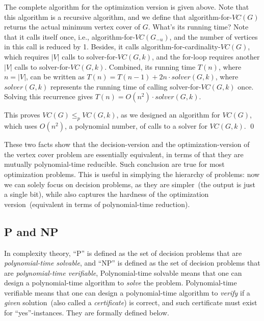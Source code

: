 \begin{algorithmblock}[0.8\textwidth]
	\xxx
	\xxx
	\xxx
	\xxx
	\xxx
	\xxx
	\xxx
	\xxx
\end{algorithmblock}

The complete algorithm for the optimization version is given above.
Note that this algorithm is a recursive algorithm, and we define
that algorithm-for-$VC(G)$ returns the actual minimum vertex cover of $G$.
What's its running time? Note that it calls itself once, i.e., 
algorithm-for-$VC(G_{-u})$, and the number of vertices in this call
is reduced by 1. Besides, it calls algorithm-for-cardinality-$VC(G)$,
which requires $|V|$ calls to solver-for-$VC(G, k)$,
and the for-loop requires another $|V|$ calls to solver-for-$VC(G, k)$.
Combined, its running time $T(n)$, where $n = |V|$, can be written
as $T(n) = T(n-1) + 2n\cdot solver(G,k)$, where $solver(G,k)$ represents
the running time of calling solver-for-$VC(G, k)$ once.
Solving this recurrence gives $T(n) = O(n^2)\cdot solver(G,k)$.

This proves $VC(G) \le_p VC(G,k)$, as we designed an algorithm
for $VC(G)$, which uses $O(n^2)$, a polynomial number, of calls
to a solver for $VC(G, k)$. \qed

These two facts show that the decision-version and the optimization-version
of the vertex cover problem are essentially equivalent, in terms of that they are mutually polynomial-time reducible.
Such conclusion are true for most optimization problems.
This is useful in simplying the hierarchy of problems: now we can solely focus on decision problems, as they are simpler~(the output is just a single bit),
while also captures the hardness of the optimization version~(equivalent in terms of polynomial-time reduction).

\subsection*{P and NP}

In complexity theory, ``P'' is defined as the set of decision problems that are \emph{polynomial-time solvable}, 
and ``NP'' is defined as the set of decision problems that are \emph{polynomial-time verifiable}, 
Polynomial-time solvable means that one can design a polynomial-time algorithm to \emph{solve} the problem.
Polynomial-time verifiable means that one can design a polynomial-time algorithm to \emph{verify}
if a \emph{given} solution~(also called a \emph{certificate}) is correct,  
and such certificate must exist for ``yes''-instances.
They are formally defined below.

